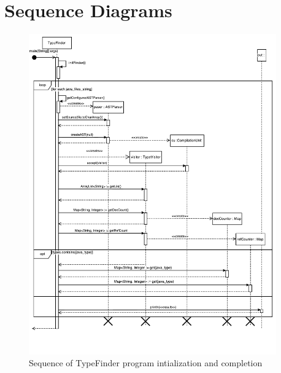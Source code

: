 \documentclass[12p]{article}
\begin{document}
\section{Sequence Diagrams}
\begin{figure}[H]
  \includegraphics[width=0.95\textwidth]{mainTypeFinder.pdf}
  \caption{Sequence of TypeFinder program intialization and completion} %
  \label{fig:sequence1}
\end{figure}
\end{document}
